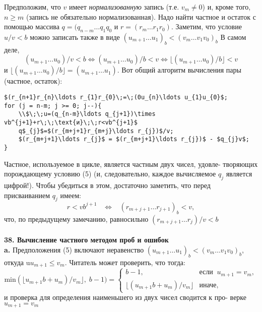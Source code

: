 Предположим, что $v$ имеет \textit{нормализованную } запись (т.е. $v_{m} \neq 0$)
и, кроме того, $n \geqslant m$ (запись не обязательно нормализованная). Надо
найти частное и остаток с помощью массива $q = (q_{n-m}\ldots q_{1}q_{0}$ и $r = (r_{m}\ldots r_{1}r_{0})$. Заметим, что условие $u/v < b$ можно записать также в
виде $(u_{m+1}\ldots u_{1})_{b}<(v_{m}\ldots v_{1}v_{0})_{b}$ В самом деле,
$$(u_{m+1}\ldots u_{0})/v<b \Leftrightarrow (u_{m+1}\ldots u_{0})/b<v \Leftrightarrow \lfloor(u_{m+1}\ldots u_{0})/b\rfloor<v$$
\newpage
\noindent и $\lfloor(u_{m+1}\ldots u_{0})/b\rfloor=(u_{m+1}\ldots u_{1})$. Вот общий алгоритм вычисления пары (частное, остаток):

\begin{leftbar}
\begin{lstlisting}[frame=none, mathescape=true]
$(r_{n+1}r_{n}\ldots r_{1}r_{0}\;=\;(0u_{n}\ldots u_{1}u_{0}$;
for (j = n-m; j >= 0; j--){
	\\$\;\;u=(q_{n-m}\ldots q_{j+1})\times vb^{j+1}+r\;\;\text{и}\;\;r<vb^{j+1}$
	q$_{j}$=$(r_{m+j+1}r_{m+j}\ldots r_{j})$/v;
	$(r_{m+j+1}\ldots r_{j}$ = $(r_{m+j+1}\ldots r_{j})$ - $q_{j}v$;
}	
\end{lstlisting}
\end{leftbar}
Частное, используемое в цикле, является частным двух чисел, удо­вле- \linebreak творяющих порождающему условию (5) (и, следовательно, каждое вычисляемое $q_{j}$ является цифрой!). Чтобы убедиться в этом, достаточно заметить, что перед присваиванием $q_{j}$ имеем:
$$ r<vb^{j+1}\;\;\;\Longleftrightarrow\;\;\;(r_{m+j+1}\ldots r_{j+1})_{b}<v,$$
что, по предыдущему замечанию, равносильно $(r_{m+j+1}\ldots r_{j})/v<b$
\\\\
\noindent\textbf{38. Вычисление частного методом проб и ошибок}
\\

\textbf{a.} Предположения (5) включают неравенство $(u_{m+1}\ldots u_{1})_{b} < (v_{m}\ldots v_{1}v_{0})_{b}$, откуда u$u_{m+1}\leqslant v_{m}$. Читатель может проверить, что
тогда:
$$\text{min}(\lfloor u_{m+1}b+u_{m})/v_{m}\rfloor,\;b-1)=\left\lbrace\begin{array}{ll}
b-1,&\text{если}\;\;u_{m+1}=v_{m},\\
\lfloor(u_{m+1}b+u_{m})/v_{m}\rfloor&\text{иначе,}
\end{array}\right.$$
и проверка для определения наименьшего из двух чисел сводится к про­- \linebreak верке $u_{m+1}=v_{m}$

